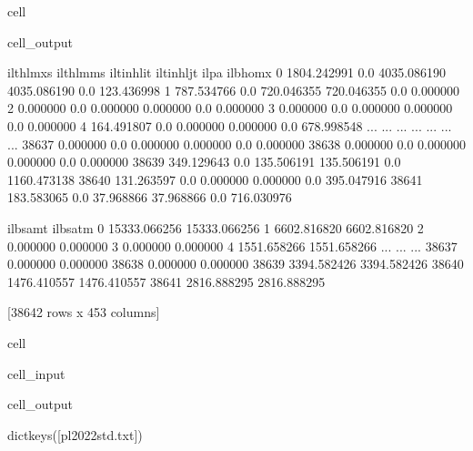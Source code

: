 \documentclass[letterpaper,10pt,english]{sphinxmanual}
\begin{document}
\begin{sphinxuseclass}{cell}
\begin{sphinxuseclass}{cell_output}
\begin{sphinxVerbatim}[commandchars=\\\{\}]
        il\PYGZus{}thlmx\PYGZus{}s  il\PYGZus{}thlmm\PYGZus{}s   il\PYGZus{}tinhlit   il\PYGZus{}tinhljt  il\PYGZus{}pa     il\PYGZus{}bhomx  \PYGZbs{}
0      1804.242991         0.0  4035.086190  4035.086190    0.0   123.436998   
1       787.534766         0.0   720.046355   720.046355    0.0     0.000000   
2         0.000000         0.0     0.000000     0.000000    0.0     0.000000   
3         0.000000         0.0     0.000000     0.000000    0.0     0.000000   
4       164.491807         0.0     0.000000     0.000000    0.0   678.998548   
...            ...         ...          ...          ...    ...          ...   
38637     0.000000         0.0     0.000000     0.000000    0.0     0.000000   
38638     0.000000         0.0     0.000000     0.000000    0.0     0.000000   
38639   349.129643         0.0   135.506191   135.506191    0.0  1160.473138   
38640   131.263597         0.0     0.000000     0.000000    0.0   395.047916   
38641   183.583065         0.0    37.968866    37.968866    0.0   716.030976   

           il\PYGZus{}bsamt      il\PYGZus{}bsatm  
0      15333.066256  15333.066256  
1       6602.816820   6602.816820  
2          0.000000      0.000000  
3          0.000000      0.000000  
4       1551.658266   1551.658266  
...             ...           ...  
38637      0.000000      0.000000  
38638      0.000000      0.000000  
38639   3394.582426   3394.582426  
38640   1476.410557   1476.410557  
38641   2816.888295   2816.888295  

[38642 rows x 453 columns]
\end{sphinxVerbatim}

\end{sphinxuseclass}
\end{sphinxuseclass}
\begin{sphinxuseclass}{cell}
\begin{sphinxuseclass}{cell_input}
\begin{sphinxVerbatim}[commandchars=\\\{\}]
\PYG{p}{[}\PYG{p}{]}
\end{sphinxVerbatim}

\end{sphinxuseclass}
\begin{sphinxuseclass}{cell_output}
\begin{sphinxVerbatim}[commandchars=\\\{\}]
dict\PYGZus{}keys([\PYGZsq{}pl\PYGZus{}2022\PYGZus{}std.txt\PYGZsq{}])
\end{sphinxVerbatim}

\end{sphinxuseclass}
\end{sphinxuseclass}
\end{document}
